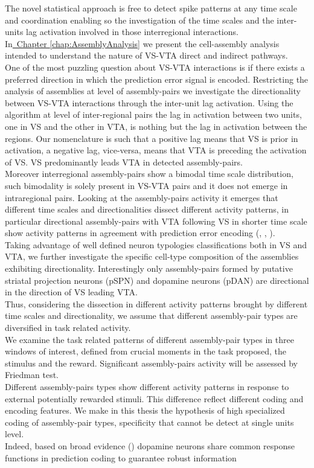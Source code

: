 The novel statistical approach is free to detect spike patterns at any time scale and coordination enabling so the investigation of the time scales and the inter-units lag activation involved in those interregional interactions.\\In\hyperref[chap:AssemblyAnalysis]{~Chapter \ref*{chap:AssemblyAnalysis}} we present the cell-assembly analysis intended to understand the nature of VS-VTA direct and indirect pathways.\\One of the most puzzling question about VS-VTA interactions is if there exists a preferred direction in which the prediction error signal is encoded. Restricting the analysis of assemblies at level of assembly-pairs we investigate the directionality between VS-VTA interactions through the inter-unit lag activation. Using the algorithm at level of inter-regional pairs the lag in activation between two units, one in VS and the other in VTA, is nothing but the lag in activation between the regions. Our nomenclature is such that a positive lag means that VS is prior in activation, a negative lag, vice-versa, means that VTA is preceding the activation of VS. VS predominantly leads VTA in detected assembly-pairs.\\Moreover interregional assembly-pairs show a bimodal time scale distribution, such bimodality is solely present in VS-VTA pairs and it does not emerge in intraregional pairs. Looking at the assembly-pairs activity it emerges that different time scales and directionalities dissect different activity patterns, in particular directional assembly-pairs with VTA following VS in shorter time scale show activity patterns in agreement with prediction error encoding (\cite{Tobler2003}, \cite{Nomoto2010}, \cite{Schultz2016}).\\Taking advantage of well defined neuron typologies classifications both in VS and VTA, we further investigate the specific cell-type composition of the assemblies exhibiting directionality. Interestingly only assembly-pairs formed by putative striatal projection neurons (pSPN) and dopamine neurons (pDAN) are directional in the direction of VS leading VTA.\\Thus, considering the dissection in different activity patterns brought by different time scales and directionality, we assume that different assembly-pair types are diversified in task related activity.\\We examine the task related patterns of different assembly-pair types in three windows of interest, defined from crucial moments in the task proposed, the stimulus and the reward. Significant assembly-pairs activity will be assessed by Friedman test.\\Different assembly-pairs types show different activity patterns in response to external potentially rewarded stimuli. This difference reflect different coding and encoding features. We make in this thesis the hypothesis of high specialized coding of assembly-pair types, specificity that cannot be detect at single units level.\\Indeed, based on broad evidence (\cite{Eshel}) dopamine neurons share common response functions in prediction coding to guarantee robust information 